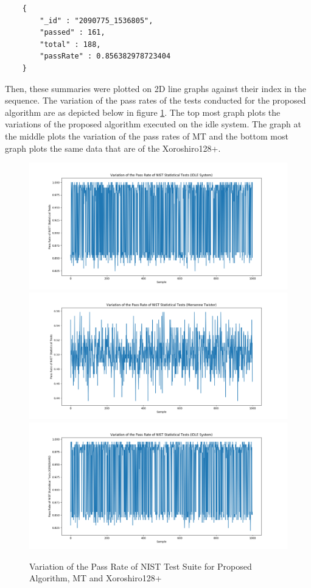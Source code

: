 \begin{code}
    \begin{verbatim}
    {
        "_id" : "2090775_1536805",
        "passed" : 161,
        "total" : 188,
        "passRate" : 0.856382978723404
    }
    \end{verbatim}
\end{code}

Then, these summaries were plotted on 2D line graphs against their index in the sequence. The variation of the pass rates of the tests conducted for the proposed algorithm are as depicted below in figure \ref{fig:4_nist_pass_rates}. The top most graph plots the variations of the proposed algorithm executed on the idle system. The graph at the middle plots the variation of the pass rates of MT and the bottom most graph plots the same data that are of the Xoroshiro128+.

\begin{figure}[h!]
    \includegraphics[width=1.0\textwidth]{images/nist_pass_rate_idle.png}
    \includegraphics[width=1.0\textwidth]{images/nist_pass_rate_mt.png}
    \includegraphics[width=1.0\textwidth]{images/nist_pass_rate_xoroshiro.png}
    \centering
    \caption{Variation of the Pass Rate of NIST Test Suite for Proposed Algorithm, MT and Xoroshiro128+}
    \label{fig:4_nist_pass_rates}
\end{figure}


